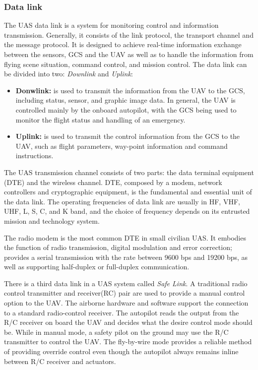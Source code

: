 \subsubsection{Data link}
The UAS data link is a system for monitoring control and information transmission. Generally, it consists of the link protocol, the transport channel and the message protocol. It is designed to achieve real-time information exchange between the sensors, GCS and the UAV as well as to handle the information from flying scene situation, command control, and mission control.\cite{6305636} The data link can be divided into two: \textit{Downlink} and \textit{Uplink}:

\begin{itemize}
    \item \textbf{Donwlink:}  is used to transmit the information from the UAV to the GCS, including status, sensor, and graphic image data. In general, the UAV is controlled mainly by the onboard autopilot, with the GCS being used to monitor the flight status and handling of an emergency. \cite{6305636}
    \item \textbf{Uplink:} is used to transmit the control information from the GCS to the UAV, such as flight parameters, way-point information and command instructions. \cite{6305636}
\end{itemize}

The UAS transmission channel consists of two parts: the data terminal equipment (DTE) and the wireless channel. DTE, composed by a modem, network controllers and cryptographic equipment, is the fundamental and essential unit of the data link. The operating frequencies of data link are usually in HF, VHF, UHF, L, S, C, and K band, and the choice of frequency depends on its entrusted mission and technology system.\cite{6305636}

The radio modem is the most common DTE in small civilian UAS. It embodies the function of radio transmission, digital modulation and error correction; provides a serial transmission with the rate between 9600 bps and 19200 bps, as well as supporting half-duplex or full-duplex communication.\cite{6305636}

There is a third data link in a UAS system called \textit{Safe Link}. A traditional radio control transmitter and receiver(RC) pair are used to provide a manual control option to the UAV. The airborne hardware and software support the connection to a standard radio-control receiver. The autopilot reads the output from the R/C receiver on board the UAV and decides what the desire control mode should be. While in manual mode, a safety pilot on the ground may use the R/C transmitter to control the UAV. The fly-by-wire mode provides a reliable method of providing override control even though the autopilot always remains inline between R/C receiver and actuators.\cite{Hattenberger2014UsingTP}


